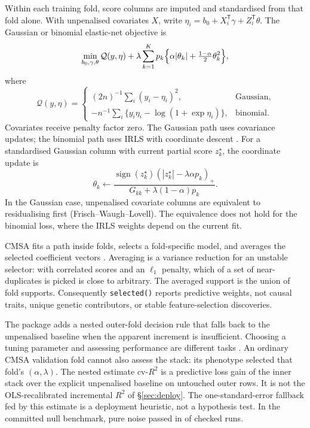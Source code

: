 \documentclass[11pt,a4paper]{article}
\newcommand{\code}[1]{\texttt{#1}}
\newcommand{\Rtwo}{\(R^2\)}
\begin{document}
Within each training fold, score columns are imputed and
standardised from that fold alone. With unpenalised covariates
\(X\), write \(\eta_i=b_0+X_i^{\mathsf T}\gamma+Z_i^{\mathsf T}\theta\).
The Gaussian or binomial elastic-net objective is
\begin{equation}
  \min_{b_0,\gamma,\theta}
  \mathcal Q(y,\eta)
  +\lambda\sum_{k=1}^{K}p_k
  \Bigl\{\alpha|\theta_k|
  +\tfrac{1-\alpha}{2}\theta_k^2\Bigr\},
  \label{eq:individual-objective}
\end{equation}
where
\begin{equation}
  \mathcal Q(y,\eta)
  =
  \begin{cases}
    (2n)^{-1}\sum_i(y_i-\eta_i)^2,
      & \text{Gaussian},\\
    -n^{-1}\sum_i\{y_i\eta_i-\log(1+\exp\eta_i)\},
      & \text{binomial}.
  \end{cases}
  \label{eq:loss}
\end{equation}
Covariates receive penalty factor zero. The Gaussian path uses
covariance updates; the binomial path uses IRLS with coordinate
descent \cite{friedman2010,zou2005}. For a standardised Gaussian
column with current partial score \(z_k^\star\), the coordinate
update is
\begin{equation}
  \theta_k \leftarrow
  \frac{\operatorname{sign}(z_k^\star)
        (|z_k^\star|-\lambda\alpha p_k)_+}
       {G_{kk}+\lambda(1-\alpha)p_k}.
  \label{eq:coordinate-update}
\end{equation}
In the Gaussian case, unpenalised covariate columns are
equivalent to residualising first (Frisch--Waugh--Lovell). The
equivalence does not hold for the binomial loss, where the IRLS
weights depend on the current fit.

CMSA fits a path inside folds, selects a fold-specific model,
and averages the selected coefficient vectors \cite{prive2019}.
Averaging is a variance reduction for an unstable selector: with
correlated scores and an \(\ell_1\) penalty, which of a set of
near-duplicates is picked is close to arbitrary. The averaged
support is the union of fold supports. Consequently
\code{selected()} reports predictive weights, not causal traits,
unique genetic contributors, or stable feature-selection
discoveries.

The package adds a nested outer-fold decision rule that falls
back to the unpenalised baseline when the apparent increment is
insufficient. Choosing a tuning parameter and assessing
performance are different tasks
\cite{stone1974,varma2006}. An ordinary CMSA validation fold
cannot also assess the stack: its phenotype selected that fold's
\((\alpha,\lambda)\). The nested estimate \(\mathrm{cv}\text{-}R^2\)
is a predictive loss gain of the inner stack over the explicit
unpenalised baseline on untouched outer rows. It is not the
OLS-recalibrated incremental \Rtwo{} of
\S\ref{sec:deploy}. The one-standard-error fallback fed by this
estimate is a deployment heuristic, not a hypothesis test. In
the committed null benchmark, pure noise passed in
\ReportNullPasses{} of \ReportNullReplicates{} checked runs.
\end{document}
